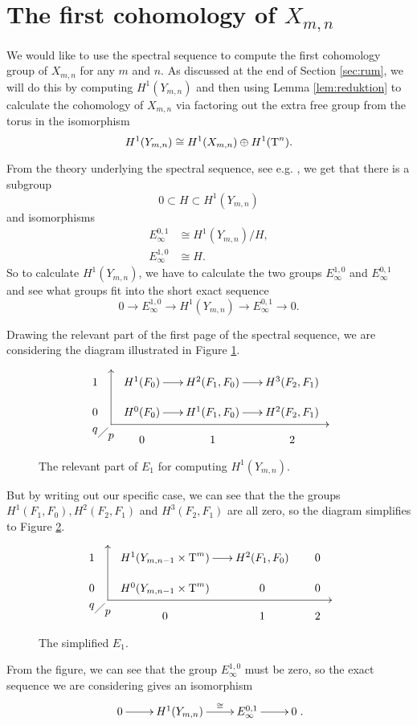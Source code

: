 
\section{The first cohomology of $X_{m,n}$}
\label{sec:firstcohom}

We would like to use the spectral sequence to compute the first
cohomology group of $X_{m,n}$ for any $m$ and $n$. As discussed at the
end of Section \ref{sec:rum}, we will do this by computing
$H^1(Y_{m,n})$ and
then using Lemma \ref{lem:reduktion} to calculate the cohomology of
$X_{m,n}$ via factoring out the extra free group from the torus
in the isomorphism
\[ H^1(Y_{m,n}) \cong H^1(X_{m,n}) \oplus H^1(\operatorname{T}^n). \]

From the theory
underlying the spectral sequence, see e.g. \cite[Chapter
1]{hatcherss}, we get that there is a subgroup
\[ 0 \subset H \subset H^1(Y_{m,n}) \]
and isomorphisms
\begin{align*}
  E_\infty^{0,1} &\cong H^1(Y_{m,n})/H, \\
  E_\infty^{1,0} &\cong H.
\end{align*}
So to calculate $H^1(Y_{m,n})$, we have to calculate the two groups
$E_\infty^{1,0}$ and $E_\infty^{0,1}$ and see what groups fit
into the short exact sequence
\[ 0 \to E^{1,0}_\infty \to H^1(Y_{m,n}) \to E^{0,1}_\infty \to 0. \]

Drawing the relevant part of the first page of the spectral sequence,
we are considering the diagram illustrated in Figure
\ref{fig:foerste}.
\begin{figure}[ht]
  \[ \xy
  (5,4); (5,-13); **\dir{-}; (5,4); *\dir{>};
  (5,-13); (73,-13); **\dir{-}; *\dir{<};
  (0,-15)*{q}; (5,-17)*{p};
  (1,-17); (4,-14); **\dir{-};
  (0,0)\xymatrix@R=1em@C=1.7em{
    1 & H^1(F_0) \ar[r]& H^2(F_1,F_0) \ar[r] & H^3(F_2,F_1) \\
    0 & H^0(F_0) \ar[r] & H^1(F_1,F_0) \ar[r] & H^2(F_2,F_1) \\
    & 0 & 1 & 2
  } \endxy \]
  \caption{The relevant part of $E_1$ for computing $H^1(Y_{m,n})$.}
  \label{fig:foerste}
\end{figure}
But by writing out our specific case, we can see that the the groups
$H^1(F_1,F_0), H^2(F_2,F_1)$ and $H^3(F_2,F_1)$ are all zero, so the
diagram simplifies to Figure \ref{fig:anden}. 
\begin{figure}[ht]
  \[ \xy
  (5,4); (5,-13); **\dir{-}; (5,4); *\dir{>};
  (5,-13); (75,-13); **\dir{-}; *\dir{<};
  (0,-15)*{q}; (5,-17)*{p};
  (1,-17); (4,-14); **\dir{-};
  (0,0)\xymatrix@R=1em@C=1.7em{
    1 & H^1(Y_{m,n-1}\times \T^m) \ar[r]& H^2(F_1,F_0) & 0 \\
    0 & H^0(Y_{m,n-1}\times \T^{m}) & 0 & 0 \\
    & 0 & 1 & 2
  } \endxy \]
  \caption{The simplified $E_1$.}
  \label{fig:anden}
\end{figure}
From the figure, we can see that the group $E_\infty^{1,0}$
must be zero, so the exact sequence we are considering gives an
isomorphism
\[ \xymatrix{0 \ar[r] & H^1(Y_{m,n}) \ar[r]^>>>>>{\cong} & E^{0,1}_\infty
  \ar[r] & 0}. \]

